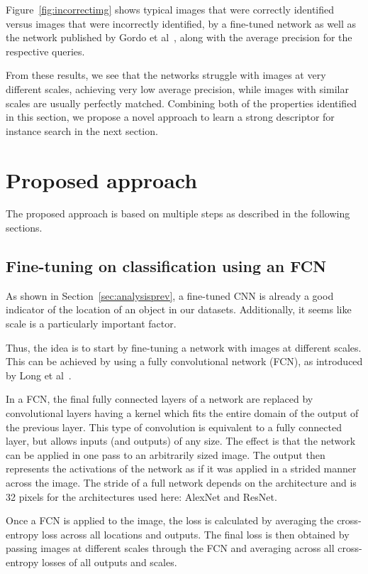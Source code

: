 Figure~\ref{fig:incorrectimg}
shows typical images that were correctly identified versus images that
were incorrectly identified, by a fine-tuned network as well as the network
published by Gordo et al~\cite{gordo_deep_2016}, along with the average
precision for the respective queries.

From these results, we see that the networks struggle with images at
very different scales, achieving very low average precision,
while images with similar scales are usually perfectly matched.
Combining both of the properties identified in this section, we
propose a novel approach to learn a strong descriptor for instance
search in the next section.

\section{Proposed approach}\label{sec:proposed}
The proposed approach is based on multiple steps as described in the
following sections.

\subsection{Fine-tuning on classification using an FCN}\label{sec:fcnfinetune}
As shown in Section~\ref{sec:analysisprev}, a fine-tuned CNN is already
a good indicator of the location of an object in our datasets.
Additionally, it seems like scale is a particularly important factor.

Thus, the idea is to start by fine-tuning a network with images
at different scales. This can be achieved by using a fully
convolutional network (FCN), as introduced by
Long et al~\cite{long_fully_2015}.

In a FCN, the final fully connected layers
of a network are replaced by convolutional layers having a kernel
which fits the entire domain of the output of the previous layer.
This type of convolution is equivalent to a fully connected layer,
but allows inputs (and outputs) of any size.
The effect is that the network can be applied in one pass to an
arbitrarily sized image. The output then represents the activations
of the network as if it was applied in a strided manner across the image.
The stride of a full network depends on the architecture and is 32
pixels for the architectures used here: AlexNet and ResNet.

Once a FCN is applied to the image, the loss
is calculated by averaging the cross-entropy loss across all locations
and outputs.
The final loss is then obtained by passing images at different scales
through the FCN and averaging across all cross-entropy losses of all
outputs and scales.

